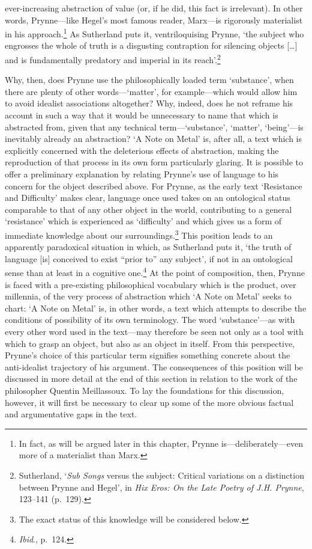 \documentclass[]{article}
\begin{document}
ever-increasing abstraction of value (or, if he did, this fact is
irrelevant). In other words, Prynne—like Hegel’s most famous reader,
Marx—is rigorously materialist in his approach.\footnote{In fact, as
  will be argued later in this chapter, Prynne is—deliberately—even more
  of a materialist than Marx.} As Sutherland puts it, ventriloquising
Prynne, ‘the subject who engrosses the whole of truth is a disgusting
contraption for silencing objects {[}\ldots{}{]} and is fundamentally
predatory and imperial in its reach’.\footnote{Sutherland, ‘\emph{Sub
  Songs} versus the subject: Critical variations on a distinction
  between Prynne and Hegel’, in \emph{Hix Eros: On the Late Poetry of
  J.H. Prynne}, 123–141 (p.~129).}

Why, then, does Prynne use the philosophically loaded term ‘substance’,
when there are plenty of other words—‘matter’, for example—which would
allow him to avoid idealist associations altogether? Why, indeed, does
he not reframe his account in such a way that it would be unnecessary to
name that which is abstracted from, given that any technical
term—‘substance’, ‘matter’, ‘being’—is inevitably already an
abstraction? ‘A Note on Metal’ is, after all, a text which is explicitly
concerned with the deleterious effects of abstraction, making the
reproduction of that process in its own form particularly glaring. It is
possible to offer a preliminary explanation by relating Prynne’s use of
language to his concern for the object described above. For Prynne, as
the early text ‘Resistance and Difficulty’ makes clear, language once
used takes on an ontological status comparable to that of any other
object in the world, contributing to a general ‘resistance’ which is
experienced as ‘difficulty’ and which gives us a form of immediate
knowledge about our surroundings.\footnote{The exact status of this
  knowledge will be considered below.} This position leads to an
apparently paradoxical situation in which, as Sutherland puts it, ‘the
truth of language {[}is{]} conceived to exist “prior to” any subject’,
if not in an ontological sense than at least in a cognitive
one.\footnote{\emph{Ibid}., p.~124.} At the point of composition, then,
Prynne is faced with a pre-existing philosophical vocabulary which is
the product, over millennia, of the very process of abstraction which ‘A
Note on Metal’ seeks to chart: ‘A Note on Metal’ is, in other words, a
text which attempts to describe the conditions of possibility of its own
terminology. The word ‘substance’—as with every other word used in the
text—may therefore be seen not only as a tool with which to grasp an
object, but also as an object in itself. From this perspective, Prynne’s
choice of this particular term signifies something concrete about the
anti-idealist trajectory of his argument. The consequences of this
position will be discussed in more detail at the end of this section in
relation to the work of the philosopher Quentin Meillassoux. To lay the
foundations for this discussion, however, it will first be necessary to
clear up some of the more obvious factual and argumentative gaps in the
text.
\end{document}
